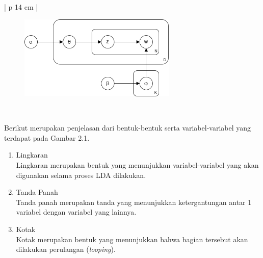 \begin{table}[H]
\begin{adjustbox}{width=1\textwidth}
\begin{tabular}{| p {14 cm} |}
\hline
\begin{figure}[H]
	\centering
	\includegraphics[width=7.5cm]{images/LDAModel}
\end{figure}\\
\hline
\end{tabular}
\end{adjustbox}
\end{table}

\indent
Berikut merupakan penjelasan dari bentuk-bentuk serta variabel-variabel yang terdapat pada Gambar 2.1.

\begin{enumerate}[nolistsep,leftmargin=0.5cm]
\item
Lingkaran \\
Lingkaran merupakan bentuk yang menunjukkan variabel-variabel yang akan digunakan selama proses LDA dilakukan.
\item
Tanda Panah \\
Tanda panah merupakan tanda yang menunjukkan ketergantungan antar 1 variabel dengan variabel yang lainnya.
\item
Kotak \\
Kotak merupakan bentuk yang menunjukkan bahwa bagian tersebut akan dilakukan perulangan ({\itshape looping}).
\end{enumerate}

